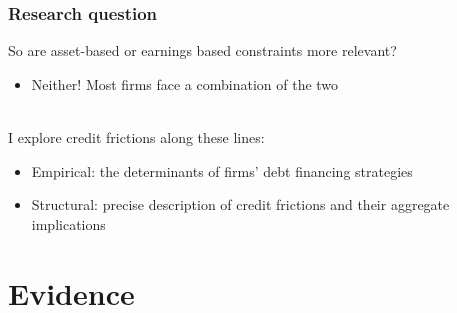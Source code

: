 \documentclass[notes]{beamer}
\begin{document}
\begin{frame}
  \frametitle{Research question}
  
So are asset-based or earnings based constraints more relevant? 
\begin{itemize}
    \item Neither! Most firms face a combination of the two
\end{itemize} \vspace{5mm} \\
I explore credit frictions along these lines: 
\begin{itemize}
 \setlength\itemsep{0em}
    \item Empirical: the determinants of firms' debt financing strategies
    \item Structural: precise description of credit frictions and their aggregate implications
\end{itemize}
  

\end{frame}
\section{Evidence}
\end{document}
